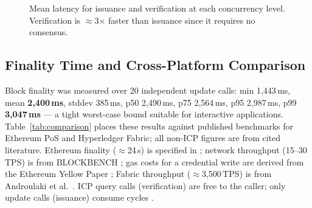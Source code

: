 \documentclass[conference]{IEEEtran}
\begin{document}
\begin{figure}[t]
\centering
{}
\caption{Mean latency for issuance and verification at each concurrency level. Verification is $\approx$3$\times$ faster than issuance since it requires no consensus.}
\label{fig:conc_lat}
\end{figure}

\subsection{Finality Time and Cross-Platform Comparison}

Block finality was measured over 20 independent update calls: min 1{,}443\,ms, mean \textbf{2{,}400\,ms}, stddev 385\,ms, p50 2{,}490\,ms, p75 2{,}564\,ms, p95 2{,}987\,ms, p99 \textbf{3{,}047\,ms} — a tight worst-case bound suitable for interactive applications. Table~\ref{tab:comparison} places these results against published benchmarks for Ethereum PoS and Hyperledger Fabric; all non-ICP figures are from cited literature. Ethereum finality ($\approx$24\,s) is specified in \cite{buterin2020eth2}; network throughput (15--30\,TPS) is from BLOCKBENCH \cite{dinh2017blockbench}; gas costs for a credential write are derived from the Ethereum Yellow Paper \cite{wood2014ethereum}; Fabric throughput ($\approx$3,500\,TPS) is from Androulaki et al.\ \cite{androulaki2018fabric}. ICP query calls (verification) are free to the caller; only update calls (issuance) consume cycles \cite{dfinity2022geeks}.
\end{document}
